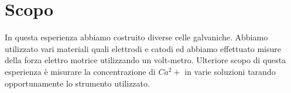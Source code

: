 \section*{Scopo}
In questa esperienza abbiamo costruito diverse celle galvaniche.
Abbiamo utilizzato vari materiali quali elettrodi e catodi ed abbiamo effettuato misure della forza elettro motrice utilizzando un volt-metro.
Ulteriore scopo di questa esperienza è misurare la concentrazione di $Ca^2+$ in varie soluzioni tarando opportunamente lo strumento utilizzato.